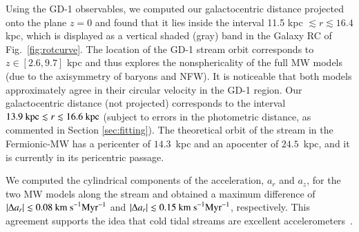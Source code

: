 \documentclass[twocolumn]{aa}
\begin{document}
Using the GD-1 observables, we computed our galactocentric distance projected onto the plane $z=0$ and found that it lies inside the interval 11.5 kpc $\lesssim r \lesssim 16.4$ kpc, which is displayed as a vertical shaded (gray) band in the Galaxy RC of Fig.~\ref{fig:rotcurve}. The location of the GD-1 stream orbit corresponds to $z\in [2.6, 9.7]$ kpc and thus explores the nonsphericality of the full MW models (due to the axisymmetry of baryons and NFW).
It is noticeable that both models approximately agree in their circular velocity in the GD-1 region.
Our galactocentric distance (not projected) corresponds to the interval $13.9~\textrm{kpc} \lesssim r \lesssim 16.6~\rm{kpc}$ (subject to errors in the photometric distance, as commented in Section \ref{sec:fitting}). The theoretical orbit of the stream in the Fermionic-MW has a pericenter of $14.3$~kpc and an apocenter of $24.5$~kpc, and it is currently in its pericentric passage.

We computed the cylindrical components of the acceleration, $a_r$ and $a_z$,
for the two MW models along the stream and obtained a maximum difference of $|\Delta a_r| \lesssim 0.08 \rm{~km~s}^{-1} \rm{Myr}^{-1}$ and $|\Delta a_r| \lesssim 0.15 \rm{~km~s}^{-1} \rm{Myr}^{-1}$, respectively. This agreement supports  the idea that cold tidal streams are excellent accelerometers~\citep{Ibata_2016,2022ApJ...940...22N,2023ApJ...945L..32C}.
\end{document}
